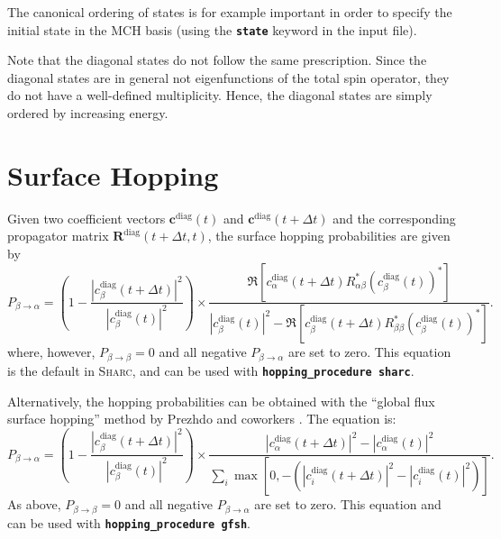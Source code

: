 \documentclass[a4paper,10pt,DIV=15,openany]{scrbook}
\newcommand{\sharc}{\textsc{Sharc}}
\newcommand{\ttt}[1]{\textbf{\texttt{#1}}}
\newcommand{\VEC}[1]{\ensuremath{\mathbf{#1}}}
\begin{document}
The canonical ordering of states is for example important in order to specify the initial state in the MCH basis (using the \ttt{state} keyword in the input file).

Note that the diagonal states do not follow the same prescription. Since the diagonal states are in general not eigenfunctions of the total spin operator, they do not have a well-defined multiplicity. 
Hence, the diagonal states are simply ordered by increasing energy.


\section{Surface Hopping}\label{met:hopping}

Given two coefficient vectors $\VEC{c}^{\text{diag}}(t)$ and $\VEC{c}^{\text{diag}}(t+\Delta t)$ and the corresponding propagator matrix $\VEC{R}^{\text{diag}}(t+\Delta t,t)$, the surface hopping probabilities are given by
\begin{equation}
  P_{\beta\rightarrow\alpha}=
  \left(
    1-
    \frac{
      \left|
        c_\beta^{\text{diag}}(t+\Delta t)
      \right|^2
    }{
      \left|
        c_\beta^{\text{diag}}(t)
      \right|^2
    }\right)
    \times
    \frac{
      \Re\left[
        c^{\text{diag}}_\alpha(t+\Delta t)
        R^*_{\alpha\beta}
        \left(
          c^{\text{diag}}_\beta(t)
        \right)^*
      \right]
    }{
      \left|
        c^{\text{diag}}_\beta(t)
      \right|^2
      -\Re\left[
        c^{\text{diag}}_\beta(t+\Delta t)
        R^*_{\beta\beta}
        \left(
          c^{\text{diag}}_\beta(t)
        \right)^*
      \right]
    }.
\end{equation}
where, however, $P_{\beta\rightarrow\beta}=0$ and all negative $P_{\beta\rightarrow\alpha}$ are set to zero.
This equation is the default in \sharc, and can be used with \ttt{hopping\_procedure sharc}.

Alternatively, the hopping probabilities can be obtained with the ``global flux surface hopping'' method by Prezhdo and coworkers \cite{Wang2014JCTC}.
The equation is:
\begin{equation}
  P_{\beta\rightarrow\alpha}=
  \left(
    1-
    \frac{
      \left|
        c_\beta^{\text{diag}}(t+\Delta t)
      \right|^2
    }{
      \left|
        c_\beta^{\text{diag}}(t)
      \right|^2
    }\right)
    \times
    \frac{
      |c^{\text{diag}}_\alpha(t+\Delta t)|^2-|c^{\text{diag}}_\alpha(t)|^2
    }{
      \sum_{i} \max\left[0,-(|c^{\text{diag}}_i(t+\Delta t)|^2-|c^{\text{diag}}_i(t)|^2)\right]
    }.
\end{equation}
As above, $P_{\beta\rightarrow\beta}=0$ and all negative $P_{\beta\rightarrow\alpha}$ are set to zero.
This equation and can be used with \ttt{hopping\_procedure gfsh}.
\end{document}
